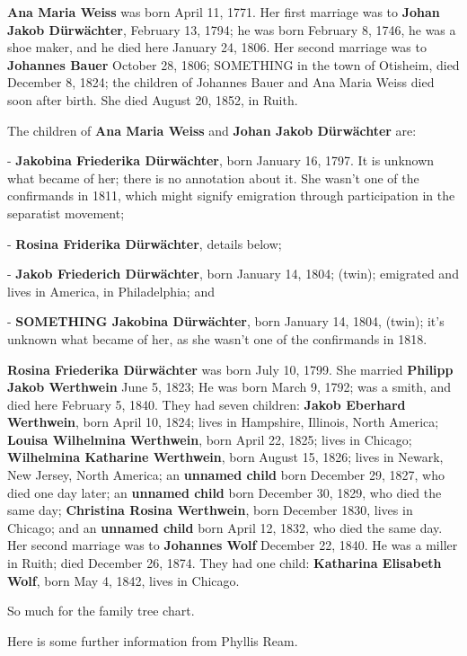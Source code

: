 {\bf Ana Maria Weiss} was born April 11, 1771.  
%
Her first marriage was to {\bf Johan Jakob D\"urw\"achter}, February 13, 1794; he was
born February 8, 1746, he was a shoe maker, and he died here January 24, 1806.  
%
Her second marriage was to {\bf Johannes Bauer} October 28, 1806; SOMETHING in
the town of Otisheim, died December 8, 1824; the children of Johannes Bauer
and Ana Maria Weiss died soon after birth.  
%
She died August 20, 1852, in Ruith.

The children of {\bf Ana Maria Weiss} and {\bf Johan Jakob D\"urw\"achter} are:
\item -
{\bf Jakobina Friederika D\"urw\"achter}, born January 16, 1797.  It is unknown what
became of her; there is no annotation about it.  She wasn't one of the
confirmands in 1811, which might signify emigration through participation in the
separatist movement;
\item -
{\bf Rosina Friderika D\"urw\"achter}, details below;
\item -
{\bf Jakob Friederich D\"urw\"achter}, born January 14, 1804; (twin); emigrated and lives in
America, in Philadelphia; and
\item -
{\bf SOMETHING Jakobina D\"urw\"achter}, born January 14, 1804, (twin); it's unknown what
became of her, as she wasn't one of the confirmands in 1818.

{\bf Rosina Friederika D\"urw\"achter} was born July 10, 1799.  
She married {\bf Philipp Jakob Werthwein} June 5, 1823; 
He was born March 9, 1792; was a smith, and died here February 5, 1840.
They had seven children:
{\bf Jakob Eberhard Werthwein}, born April 10, 1824; lives in Hampshire, Illinois, North America;
{\bf Louisa Wilhelmina Werthwein}, born April 22, 1825; lives in Chicago;
{\bf Wilhelmina Katharine Werthwein}, born August 15, 1826; lives in
Newark, New Jersey, North America;
an {\bf unnamed child} born December 29, 1827, who died one day later;
an {\bf unnamed child} born December 30, 1829, who died the same day;
{\bf Christina Rosina Werthwein}, born December 1830, lives in Chicago; and 
an {\bf unnamed child} born April 12, 1832, who died the same day.
Her second marriage was to {\bf Johannes Wolf} December 22, 1840.  
He was a miller in Ruith; died December 26, 1874.
They had one child:
{\bf Katharina Elisabeth Wolf}, born May 4, 1842, lives in Chicago.

So much for the family tree chart.

Here is some further information from Phyllis Ream.

